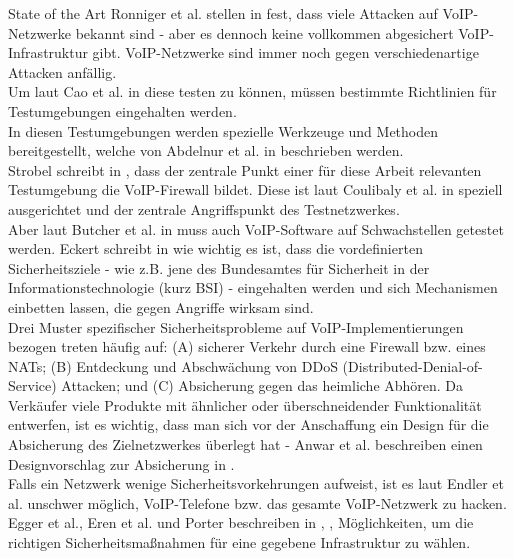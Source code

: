 \documentclass[a4paper,11pt,ngerman]{INSOexpose}
\begin{document}
\begin{section}{State of the Art}
Ronniger et al. stellen in \cite{Ronniger:2010:robflex}  fest, dass viele Attacken auf VoIP-Netzwerke bekannt sind - aber es dennoch keine vollkommen abgesichert VoIP-Infrastruktur gibt. VoIP-Netzwerke sind immer noch gegen verschiedenartige Attacken anfällig. \\
Um laut Cao et al. in \cite{CaoWang:2009:DevLab} diese testen zu können, müssen bestimmte Richtlinien für Testumgebungen eingehalten
werden. \\
In diesen Testumgebungen werden spezielle Werkzeuge und Methoden bereitgestellt, welche von Abdelnur et al. in \cite{Abdelnur:2006:voipass} beschrieben werden.  \\
Strobel schreibt in \cite{Coulibaly:2010:secvoipb}, dass der zentrale Punkt einer für diese Arbeit relevanten Testumgebung die VoIP-Firewall bildet. Diese ist laut Coulibaly et al. in \cite{Coulibaly:2010:secvoipb}  speziell ausgerichtet und der zentrale Angriffspunkt des Testnetzwerkes. \\
Aber laut Butcher et al. in  \cite{Butcher:2007:SecChall}   muss auch VoIP-Software auf Schwachstellen getestet werden. 
Eckert schreibt in  \cite{eckert:2009:sicherheit} wie wichtig es ist, dass die vordefinierten Sicherheitsziele - wie z.B. jene des Bundesamtes für Sicherheit in der Informationstechnologie (kurz BSI) - eingehalten werden und sich
Mechanismen einbetten lassen, die gegen Angriffe wirksam sind. 
\\
Drei Muster spezifischer Sicherheitsprobleme auf VoIP-Implementierungen bezogen treten
häufig auf: (A) sicherer Verkehr durch eine Firewall bzw. eines NATs; (B) Entdeckung und
Abschwächung von DDoS (Distributed-Denial-of-Service) Attacken; und (C) Absicherung
gegen das heimliche Abhören. Da Verkäufer viele Produkte mit ähnlicher oder
überschneidender Funktionalität entwerfen, ist es wichtig, dass man sich vor der
Anschaffung ein Design für die Absicherung des Zielnetzwerkes überlegt hat - Anwar et al. beschreiben einen Designvorschlag zur Absicherung in \cite{Anwar:2006:despatt} .\\
Falls ein Netzwerk wenige Sicherheitsvorkehrungen aufweist, ist es laut Endler et al. \cite{endler:2006:hacking} unschwer möglich, VoIP-Telefone bzw. das gesamte VoIP-Netzwerk zu hacken.
 \\
Egger et al., Eren et al. und Porter beschreiben in \cite{Egger:2008:linVoip} ,\cite{eren:2007:voip} ,\cite{porter:2006:practicalvoip} Möglichkeiten, um die richtigen Sicherheitsmaßnahmen für eine gegebene Infrastruktur zu wählen. \\

\end{section}
\pagebreak
\end{document}
